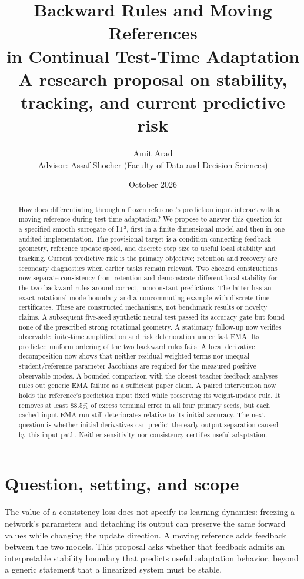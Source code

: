 \documentclass[11pt,a4paper]{article}
\title{Backward Rules and Moving References\\in Continual Test-Time Adaptation\\[0.4em]
\large A research proposal on stability, tracking, and current predictive risk}
\author{Amit Arad\\[0.3em]
\small Advisor: Assaf Shocher (Faculty of Data and Decision Sciences)}
\date{October 2026}
\begin{document}
\maketitle
\begin{abstract}
How does differentiating through a frozen reference's prediction input
interact with a moving reference during test-time adaptation? We propose
to answer this question for a specified smooth surrogate of IT$^3$, first
in a finite-dimensional model and then in one audited implementation.
The provisional target is a condition connecting feedback geometry,
reference update speed, and discrete step size to useful local stability
and tracking. Current predictive risk is the primary objective; retention
and recovery are secondary diagnostics when earlier tasks remain relevant.
Two checked constructions now separate consistency from retention and
demonstrate different local stability for the two backward rules around
correct, nonconstant predictions. The latter has an exact rotational-mode
boundary and a noncommuting example with discrete-time certificates.
These are constructed mechanisms, not benchmark results or novelty
claims. A subsequent five-seed synthetic neural test passed its accuracy
gate but found none of the prescribed strong rotational geometry. A
stationary follow-up now verifies observable finite-time amplification and
risk deterioration under fast EMA. Its predicted uniform ordering of the
two backward rules fails. A local derivative decomposition now shows that
neither residual-weighted terms nor unequal student/reference parameter
Jacobians are required for the measured positive observable modes.
A bounded comparison with the closest teacher-feedback analyses rules
out generic EMA failure as a sufficient paper claim. A paired intervention
now holds the reference's prediction input fixed while preserving its
weight-update rule. It removes at least 88.5\% of excess terminal error
in all four primary seeds, but each cached-input EMA run still deteriorates
relative to its initial accuracy. The next question is whether initial derivatives
can predict the early output separation caused by this input path.
Neither sensitivity nor consistency certifies useful adaptation.
\end{abstract}

\section{Question, setting, and scope}
The value of a consistency loss does not specify its learning dynamics:
freezing a network's parameters and detaching its output can preserve the
same forward values while changing the update direction. A moving reference
adds feedback between the two models. This proposal asks whether that
feedback admits an interpretable stability boundary that predicts useful
adaptation behavior, beyond a generic statement that a linearized system
must be stable.
\end{document}
